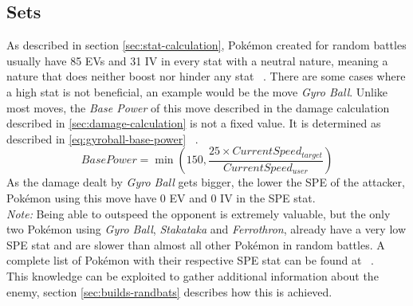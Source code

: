 \label{sec:showdown-randbats}
\subsection{Sets}
\label{sec:randbats-sets}
As described in section \ref{sec:stat-calculation}, Pokémon created for random battles
usually have 85 \ac{EV}s and 31 \ac{IV} in every stat with a neutral nature, 
meaning a nature that does neither boost nor hinder any stat ~\autocite{Smogon:RandBatsGuide}.
There are some cases where a high stat is not beneficial, an example would be the 
move \textit{Gyro Ball}. Unlike most moves, the \textit{Base Power} of this move
described in the damage calculation described in \ref{sec:damage-calculation} is not
a fixed value. It is determined as described in \ref{eq:gyroball-base-power} ~\autocite{Bulbapedia:GyroBall}.
\begin{equation}
	\label{eq:gyroball-base-power}
	BasePower = \min(150, \frac{25 \times CurrentSpeed_{target}}{CurrentSpeed_{user}})
\end{equation} 
As the damage dealt by \textit{Gyro Ball} gets bigger, the lower the \ac{SPE} of the
attacker, Pokémon using this move have 0 \ac{EV} and 0 \ac{IV} in the \ac{SPE} stat. \\
\textit{Note:} Being able to outspeed the opponent is extremely valuable, but the only
two Pokémon using \textit{Gyro Ball}, \textit{Stakataka} and \textit{Ferrothron}, already
have a very low \ac{SPE} stat and are slower than almost all other Pokémon in random
battles. A complete list of Pokémon with their respective \ac{SPE} stat can be found
at ~\autocite{Bulbapedia:PokemonBySpeed}. \\
This knowledge can be exploited to gather additional information about the enemy, section
\ref{sec:builds-randbats} describes how this is achieved.

